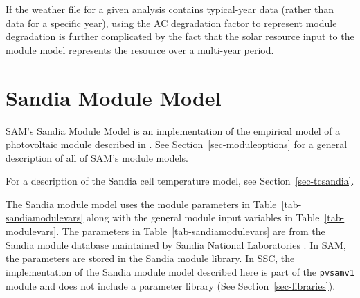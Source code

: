 \documentclass[12pt,letterpaper]{article}
\begin{document}
If the weather file for a given analysis contains typical-year data (rather than data for a specific year), using the AC degradation factor to represent module degradation is further complicated by the fact that the solar resource input to the module model represents the resource over a multi-year period.

\section{Sandia Module Model}\label{sec-sandiamodule}

SAM's Sandia Module Model is an implementation of the empirical model of a photovoltaic module described in \citet{king2004}. See Section~\ref{sec-moduleoptions} for a general description of all of SAM's module models.

For a description of the Sandia cell temperature model, see Section~\ref{sec-tcsandia}.

The Sandia module model uses the module parameters in Table~\ref{tab-sandiamodulevars} along with the general module input variables in Table~\ref{tab-modulevars}. The parameters in Table~\ref{tab-sandiamodulevars} are from the Sandia module database maintained by Sandia National Laboratories \citep{sandia-testeval}.  In SAM, the parameters are stored in the Sandia module library. In SSC, the implementation of the Sandia module model described here is part of the \texttt{pvsamv1} module and does not include a parameter library (See Section~\ref{sec-libraries}).

\end{document}

